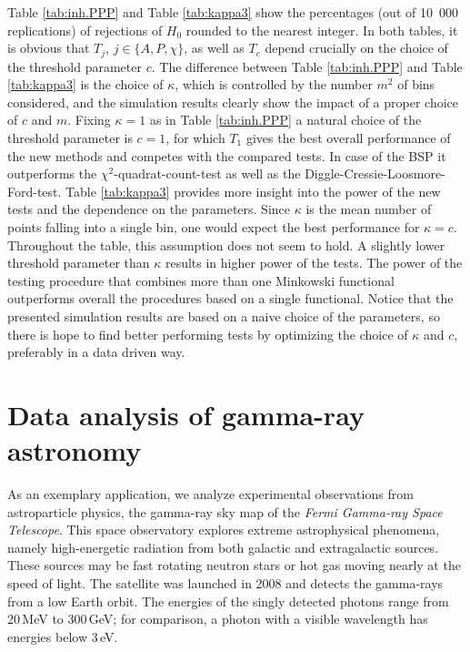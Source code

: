 \documentclass[12pt]{article}
\begin{document}
Table \ref{tab:inh.PPP} and Table \ref{tab:kappa3} show the percentages (out of 10~000 replications) of rejections of $H_0$ rounded to the nearest integer. In both tables, it is obvious that $T_j$, $j\in\{A,P,\chi\}$, as well as $T_c$ depend crucially on the choice of the threshold parameter $c$. The difference between Table \ref{tab:inh.PPP} and Table \ref{tab:kappa3} is the choice of $\kappa$, which is controlled by the number $m^2$ of bins considered, and the simulation results clearly show the impact of a proper choice of $c$ and $m$. Fixing $\kappa=1$ as in Table \ref{tab:inh.PPP} a natural choice of the threshold parameter is $c=1$, for which $T_1$ gives the best overall performance of the new methods and competes with the compared tests. In case of the BSP it outperforms the $\chi^2$-quadrat-count-test as well as the Diggle-Cressie-Loosmore-Ford-test. Table \ref{tab:kappa3} provides more insight into the power of the new tests and the dependence on the parameters. Since $\kappa$ is the mean number of points falling into a single bin, one would expect the best performance for $\kappa=c$. Throughout the table, this assumption does not seem to hold. A slightly lower threshold parameter than $\kappa$ results in higher power of the tests. The power of the testing procedure that combines more than one Minkowski functional outperforms overall the procedures based on a single functional. Notice that the presented simulation results are based on a naive choice of the parameters, so there is hope to find better performing tests by optimizing the choice of $\kappa$ and $c$, preferably in a data driven way.






\section{Data analysis of gamma-ray astronomy}\label{sec:gamma-ray}

As an exemplary application, we analyze experimental observations from astroparticle physics, the gamma-ray sky map of the {\em Fermi Gamma-ray Space Telescope}.
This space observatory explores extreme astrophysical phenomena, namely high-energetic radiation from both galactic and extragalactic sources.
These sources may be fast rotating neutron stars or hot gas moving nearly at the speed of light.
The satellite was launched in 2008 and detects the gamma-rays from a low Earth orbit.
The energies of the singly detected photons range from 20\,MeV to 300\,GeV; for comparison, a photon with a visible wavelength has energies below 3\,eV.
\end{document}

